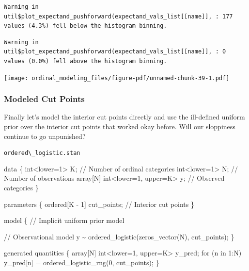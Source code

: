 \documentclass[
  letterpaper,
  DIV=11,
  numbers=noendperiod]{scrartcl}
\newenvironment{Shaded}{\begin{snugshade}}{\end{snugshade}}
\newcommand{\CommentTok}[1]{\textcolor[rgb]{0.37,0.37,0.37}{#1}}
\newcommand{\ControlFlowTok}[1]{\textcolor[rgb]{0.00,0.23,0.31}{#1}}
\newcommand{\DataTypeTok}[1]{\textcolor[rgb]{0.68,0.00,0.00}{#1}}
\newcommand{\DecValTok}[1]{\textcolor[rgb]{0.68,0.00,0.00}{#1}}
\newcommand{\KeywordTok}[1]{\textcolor[rgb]{0.00,0.23,0.31}{#1}}
\newcommand{\NormalTok}[1]{\textcolor[rgb]{0.00,0.23,0.31}{#1}}
\begin{document}
\begin{verbatim}
Warning in util$plot_expectand_pushforward(expectand_vals_list[[name]], : 177
values (4.3%) fell below the histogram binning.
\end{verbatim}

\begin{verbatim}
Warning in util$plot_expectand_pushforward(expectand_vals_list[[name]], : 0
values (0.0%) fell above the histogram binning.
\end{verbatim}

\texttt{[image: ordinal\_modeling\_files/figure-pdf/unnamed-chunk-39-1.pdf]}

\subsubsection{Modeled Cut Points}\label{modeled-cut-points-1}

Finally let's model the interior cut points directly and use the
ill-defined uniform prior over the interior cut points that worked okay
before. Will our sloppiness continue to go unpunished?

\begin{codelisting}

\caption{\texttt{ordered\textbackslash\_logistic.stan}}

\begin{Shaded}
\begin{Highlighting}[]
\KeywordTok{data}\NormalTok{ \{}
  \DataTypeTok{int}\NormalTok{\textless{}}\KeywordTok{lower}\NormalTok{=}\DecValTok{1}\NormalTok{\textgreater{} K;                   }\CommentTok{// Number of ordinal categories}
  \DataTypeTok{int}\NormalTok{\textless{}}\KeywordTok{lower}\NormalTok{=}\DecValTok{1}\NormalTok{\textgreater{} N;                   }\CommentTok{// Number of observations}
  \DataTypeTok{array}\NormalTok{[N] }\DataTypeTok{int}\NormalTok{\textless{}}\KeywordTok{lower}\NormalTok{=}\DecValTok{1}\NormalTok{, }\KeywordTok{upper}\NormalTok{=K\textgreater{} y; }\CommentTok{// Observed categories}
\NormalTok{\}}

\KeywordTok{parameters}\NormalTok{ \{}
  \DataTypeTok{ordered}\NormalTok{[K {-} }\DecValTok{1}\NormalTok{] cut\_points; }\CommentTok{// Interior cut points}
\NormalTok{\}}

\KeywordTok{model}\NormalTok{ \{}
  \CommentTok{// Implicit uniform prior model}

  \CommentTok{// Observational model}
\NormalTok{  y \textasciitilde{} ordered\_logistic(zeros\_vector(N), cut\_points);}
\NormalTok{\}}

\KeywordTok{generated quantities}\NormalTok{ \{}
  \DataTypeTok{array}\NormalTok{[N] }\DataTypeTok{int}\NormalTok{\textless{}}\KeywordTok{lower}\NormalTok{=}\DecValTok{1}\NormalTok{, }\KeywordTok{upper}\NormalTok{=K\textgreater{} y\_pred;}
  \ControlFlowTok{for}\NormalTok{ (n }\ControlFlowTok{in} \DecValTok{1}\NormalTok{:N)}
\NormalTok{    y\_pred[n] = ordered\_logistic\_rng(}\DecValTok{0}\NormalTok{, cut\_points);}
\NormalTok{\}}
\end{Highlighting}
\end{Shaded}

\end{codelisting}
\end{document}
